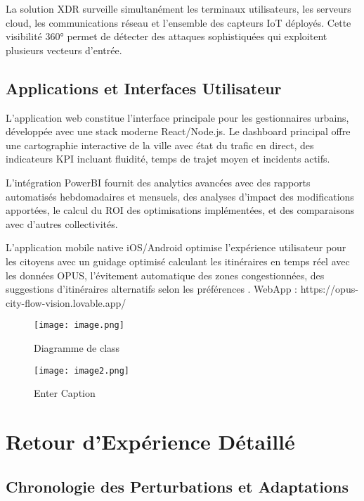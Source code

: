 \documentclass[12pt,a4paper]{article}
\begin{document}
La solution XDR surveille simultanément les terminaux utilisateurs, les serveurs cloud, les communications réseau et l'ensemble des capteurs IoT déployés. Cette visibilité 360° permet de détecter des attaques sophistiquées qui exploitent plusieurs vecteurs d'entrée.

\subsection{Applications et Interfaces Utilisateur}

L'application web constitue l'interface principale pour les gestionnaires urbains, développée avec une stack moderne React/Node.js. Le dashboard principal offre une cartographie interactive de la ville avec état du trafic en direct, des indicateurs KPI incluant fluidité, temps de trajet moyen et incidents actifs.

L'intégration PowerBI fournit des analytics avancées avec des rapports automatisés hebdomadaires et mensuels, des analyses d'impact des modifications apportées, le calcul du ROI des optimisations implémentées, et des comparaisons avec d'autres collectivités.

L'application mobile native iOS/Android optimise l'expérience utilisateur pour les citoyens avec un guidage optimisé calculant les itinéraires en 
temps réel avec les données OPUS, l'évitement automatique des zones congestionnées, des suggestions d'itinéraires alternatifs selon les préférences
.
WebApp : https://opus-city-flow-vision.lovable.app/

\begin{figure}
    \centering
    \texttt{[image: image.png]}
    \caption{Diagramme de class}
    \label{fig:enter-label}
\end{figure}

\begin{figure}
    \centering
    \texttt{[image: image2.png]}
    \caption{Enter Caption}
    \label{fig:enter-label}
\end{figure}

\section{Retour d'Expérience Détaillé}

\subsection{Chronologie des Perturbations et Adaptations}
\end{document}
